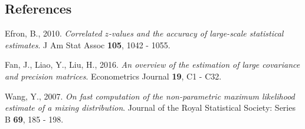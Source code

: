 \documentclass[12pt]{article}
\begin{document}
%        
%
%        

\subsection*{References}

\begin{description}
	
	\item
	Efron, B., 2010. 
	\textit{Correlated $z$-values and the accuracy of large-scale statistical estimates}.
	J Am Stat Assoc \textbf{105}, 1042 - 1055.
	
	\item
	Fan, J., Liao, Y., Liu, H., 2016. 
	\textit{An overview of the estimation of large covariance and
	precision matrices}. Econometrics Journal \textbf{19}, C1 - C32.
	
	\item
	Wang, Y., 2007. 
	\textit{On fast computation of the non-parametric maximum likelihood estimate
	of a mixing distribution}. 
	Journal of the Royal Statistical Society: Series B \textbf{69}, 185 - 198.

	\end{description}
\end{document}
